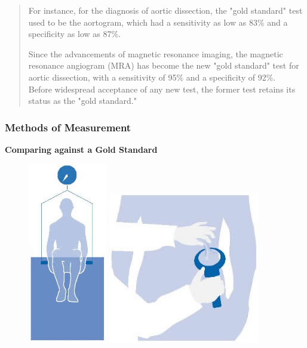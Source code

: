 \documentclass[compress]{beamer}        %
\begin{document}
		\begin{frame}
			\large
			\begin{framed}
				\begin{quote}
					For instance, for the diagnosis of aortic dissection, the "gold standard" test used to be the aortogram, which had a sensitivity as low as 83\% and a specificity as low as 87\%. \\ \smallskip
					
					Since the advancements of magnetic resonance imaging, the magnetic resonance angiogram (MRA) has become the new "gold standard" test for aortic dissection, with a sensitivity of 95\% and a specificity of 92\%. 
					\\ \smallskip
					Before widespread acceptance of any new test, the former test retains its status as the "gold standard."
				\end{quote}
			\end{framed}
			
		\end{frame}
		\begin{frame}
			\frametitle{Methods of Measurement}
			\textbf{Comparing against a Gold Standard}
			\begin{figure}
				\centering
				\includegraphics[width=0.18\linewidth]{images/watertest}
				\includegraphics[width=0.36\linewidth]{images/calipers}
			\end{figure}
			
		\end{frame}
		
\end{document}
